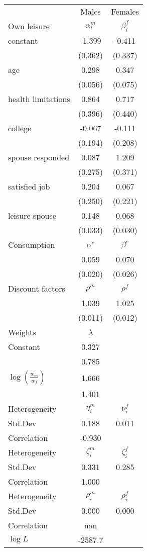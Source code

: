 \begin{tabular}{lcc} 
\hline\hline 
 & Males & Females \\ 
Own leisure & $\alpha_{i}^{m}$ & $\beta_{i}^{f}$ \\ 
constant & -1.399 & -0.411 \\ 
 & (0.362) & (0.337) \\ 
age & 0.298 & 0.347 \\ 
 & (0.056) & (0.075) \\ 
health limitations & 0.864 & 0.717 \\ 
 & (0.396) & (0.440) \\ 
college & -0.067 & -0.111 \\ 
 & (0.194) & (0.208) \\ 
spouse responded & 0.087 & 1.209 \\ 
 & (0.275) & (0.371) \\ 
satisfied job & 0.204 & 0.067 \\ 
 & (0.250) & (0.221) \\ 
leisure spouse & 0.148 & 0.068 \\ 
 & (0.033) & (0.030) \\ 
Consumption & $\alpha^{c}$ & $\beta^{c}$ \\ 
 & 0.059 & 0.070 \\ 
 & (0.020) & (0.026) \\ 
Discount factors & $\rho^m$ & $\rho^f$ \\ 
 & 1.039 & 1.025 \\ 
 & (0.011) & (0.012) \\ 
Weights & $\lambda$ &  \\ 
Constant & 0.327 &  \\ 
 & 0.785 &  \\ 
$\log(\frac{w_m}{w_f})$ & 1.666 &  \\ 
 & 1.401 &  \\ 
Heterogeneity & $\eta_i^m$ & $\nu_i^f$ \\ 
Std.Dev & 0.188 & 0.011 \\ 
Correlation & -0.930 &  \\ 
Heterogeneity & $\zeta_i^m$ & $\zeta_i^f$ \\ 
Std.Dev & 0.331 & 0.285 \\ 
Correlation & 1.000 &  \\ 
Heterogeneity & $\rho_i^m$ & $\rho_i^f$ \\ 
Std.Dev & 0.000 & 0.000 \\ 
Correlation & nan &  \\ 
\hline 
$\log L$ & -2587.7 & \\ 
\hline \hline 
\end{tabular} 
